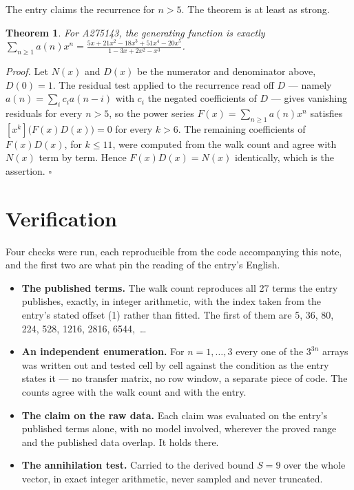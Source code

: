 \documentclass[11pt]{article}
\newtheorem{theorem}{Theorem}
\theoremstyle{definition}
\begin{document}
The entry claims the recurrence for $n > 5$. The theorem is at least as strong.

\begin{theorem} For A275143, the generating function is exactly $\sum_{n\ge 1} a(n)x^n = \frac{5x + 21x^{2} - 18x^{3} + 51x^{4} - 20x^{5}}{1 - 3x + 2x^{2} - x^{3}}$.\end{theorem}

{\itshape Proof.} Let $N(x)$ and $D(x)$ be the numerator and denominator above, $D(0)=1$. The residual test applied to the recurrence read off $D$ --- namely $a(n) = \sum_i c_i a(n-i)$ with $c_i$ the negated coefficients of $D$ --- gives vanishing residuals for every $n > 5$, so the power series $F(x)=\sum_{n\ge 1}a(n)x^n$ satisfies $[x^k]\bigl(F(x)D(x)\bigr) = 0$ for every $k > 6$. The remaining coefficients of $F(x)D(x)$, for $k \le 11$, were computed from the walk count and agree with $N(x)$ term by term. Hence $F(x)D(x) = N(x)$ identically, which is the assertion. $\square$

\section{Verification}

Four checks were run, each reproducible from the code accompanying this note, and the first two are what pin the reading of the entry's English.

\begin{itemize}

\item {\bfseries The published terms.} The walk count reproduces all 27 terms the entry publishes, exactly, in integer arithmetic, with the index taken from the entry's stated offset (1) rather than fitted. The first of them are 5, 36, 80, 224, 528, 1216, 2816, 6544,~\dots

\item {\bfseries An independent enumeration.} For $n = 1,\dots,3$ every one of the $3^{3n}$ arrays was written out and tested cell by cell against the condition as the entry states it --- no transfer matrix, no row window, a separate piece of code. The counts agree with the walk count and with the entry.

\item {\bfseries The claim on the raw data.} Each claim was evaluated on the entry's published terms alone, with no model involved, wherever the proved range and the published data overlap. It holds there.

\item {\bfseries The annihilation test.} Carried to the derived bound $S = 9$ over the whole vector, in exact integer arithmetic, never sampled and never truncated.

\end{itemize}
\end{document}
